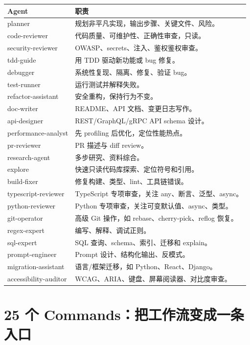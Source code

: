 \documentclass[11pt,a4paper]{ctexbook}
\begin{document}
\begin{longtable}{p{}p{}}
\toprule
Agent & 职责 \\
\midrule
planner & 规划非平凡实现，输出步骤、关键文件、风险。 \\
code-reviewer & 代码质量、可维护性、正确性审查，只读。 \\
security-reviewer & OWASP、secrets、注入、鉴权鉴权审查。 \\
tdd-guide & 用 TDD 驱动新功能或 bug 修复。 \\
debugger & 系统性复现、隔离、修复、验证 bug。 \\
test-runner & 运行测试并解释失败。 \\
refactor-assistant & 安全重构，保持行为不变。 \\
doc-writer & README、API 文档、变更日志写作。 \\
api-designer & REST/GraphQL/gRPC API schema 设计。 \\
performance-analyst & 先 profiling 后优化，定位性能热点。 \\
pr-reviewer & PR 描述与 diff review。 \\
research-agent & 多步研究、资料综合。 \\
explore & 快速只读代码库探索、定位符号和引用。 \\
build-fixer & 修复构建、类型、lint、工具链错误。 \\
typescript-reviewer & TypeScript 专项审查，关注 any、断言、泛型、async。 \\
python-reviewer & Python 专项审查，关注可变默认值、async、类型。 \\
git-operator & 高级 Git 操作，如 rebase、cherry-pick、reflog 恢复。 \\
regex-expert & 编写、解释、调试正则。 \\
sql-expert & SQL 查询、schema、索引、迁移和 explain。 \\
prompt-engineer & Prompt 设计、结构化输出、反模式。 \\
migration-assistant & 语言/框架迁移，如 Python、React、Django。 \\
accessibility-auditor & WCAG、ARIA、键盘、屏幕阅读器、对比度审查。 \\
\bottomrule
\end{longtable}

\section{25 个 Commands：把工作流变成一条入口}
\end{document}
